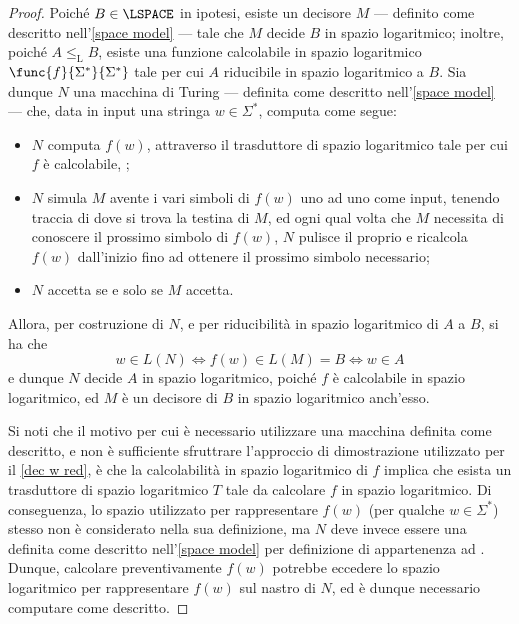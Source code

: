 \documentclass[a4paper, 12pt]{report}
\begin{document}
    \begin{proof}
        Poiché $B \in \LSPACE$ in ipotesi, esiste un decisore $M$ --- definito come descritto nell'\cref{space model} --- tale che $M$ decide $B$ in spazio logaritmico; inoltre, poiché $A \leq_\mathrm L B$, esiste una funzione calcolabile in spazio logaritmico $\func{f}{\Sigma^*}{\Sigma^*}$ tale per cui $A$ riducibile in spazio logaritmico a $B$. Sia dunque $N$ una macchina di Turing --- definita come descritto nell'\cref{space model} --- che, data in input una stringa $w \in \Sigma^*$, computa come segue:

        \begin{itemize}
            \item $N$ computa $f(w)$, attraverso il trasduttore di spazio logaritmico tale per cui $f$ è calcolabile, ;
            \item $N$ simula $M$ avente i vari simboli di $f(w)$ uno ad uno come input, tenendo traccia di dove si trova la testina di $M$, ed ogni qual volta che $M$ necessita di conoscere il prossimo simbolo di $f(w)$, $N$ pulisce il proprio  e ricalcola $f(w)$ dall'inizio fino ad ottenere il prossimo simbolo necessario;
            \item $N$ accetta se e solo se $M$ accetta.
        \end{itemize}

        Allora, per costruzione di $N$, e per riducibilità in spazio logaritmico di $A$ a $B$, si ha che $$w \in L(N) \iff f(w) \in L(M) = B \iff w \in A$$ e dunque $N$ decide $A$ in spazio logaritmico, poiché $f$ è calcolabile in spazio logaritmico, ed $M$ è un decisore di $B$ in spazio logaritmico anch'esso.

        Si noti che il motivo per cui è necessario utilizzare una macchina definita come descritto, e non è sufficiente sfruttrare l'approccio di dimostrazione utilizzato per il \cref{dec w red}, è che la calcolabilità in spazio logaritmico di $f$ implica che esista un trasduttore di spazio logaritmico $T$ tale da calcolare $f$ in spazio logaritmico. Di conseguenza, lo spazio utilizzato per rappresentare $f(w)$ (per qualche $w \in \Sigma^*$) stesso non è considerato nella sua definizione, ma $N$ deve invece essere una \TM definita come descritto nell'\cref{space model} per definizione di appartenenza ad \LSPACE. Dunque, calcolare preventivamente $f(w)$ potrebbe eccedere lo spazio logaritmico per rappresentare $f(w)$ sul nastro di $N$, ed è dunque necessario computare come descritto.
    \end{proof}
\end{document}
